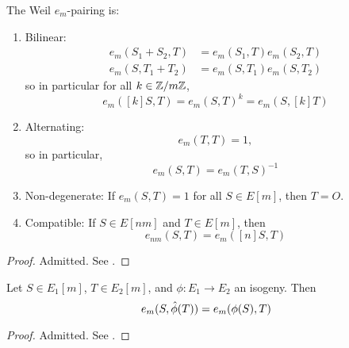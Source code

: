 \begin{proposition}
	\label{prop:pairing-properties}
	The Weil $e_m$-pairing is:
	\begin{enumerate}[itemsep=0em, label=(\alph*)]
		\item Bilinear:
			\begin{align*}
				e_m(S_1 + S_2, T) &= e_m(S_1, T)e_m(S_2, T)\\
				e_m(S, T_1 + T_2) &= e_m(S, T_1)e_m(S, T_2)
			\end{align*}
			so in particular for all $k \in \mathbb{Z}/m\mathbb{Z}$,
			\begin{equation*}
				e_m([k]S, T) = e_m(S, T)^k = e_m(S, [k]T)
			\end{equation*}
		\item Alternating:
			\begin{equation*}
				e_m(T, T) = 1,
			\end{equation*}
			so in particular,
			\begin{equation*}
				e_m(S, T) = e_m(T, S)^{-1}
			\end{equation*}
		\item Non-degenerate:
			If $e_m(S, T) = 1$ for all $S \in E[m]$, then $T = O$.
		\item Compatible:
			If $S \in E[nm]$ and $T \in E[m]$, then
			\begin{equation*}
				e_{nm}(S, T) = e_m([n]S, T)
			\end{equation*}
	\end{enumerate}
\end{proposition}

\begin{proof}
	Admitted. See \cite[III.8.1]{silverman}.
\end{proof}

\begin{proposition}
	Let $S \in E_1[m]$, $T \in E_2[m]$, and $\phi: E_1 \to E_2$
	an isogeny. Then
	\begin{equation*}
		e_m(S, \Hat\phi(T)) = e_m(\phi(S), T)
	\end{equation*}
\end{proposition}
\begin{proof}
	Admitted. See \cite[III.8.2]{silverman}.
\end{proof}

